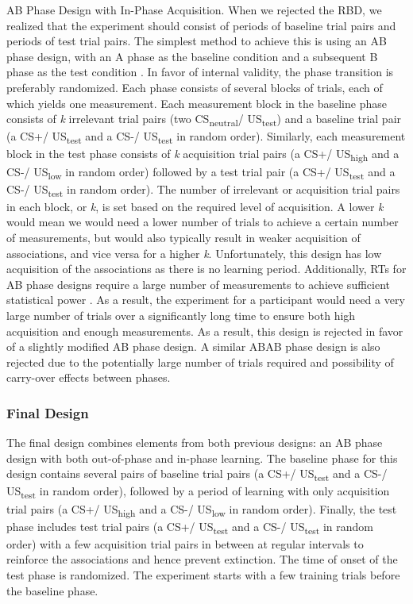 \documentclass[empirical,issue, twocolumn,authordate]{jote-new-article}
\begin{document}
AB Phase Design with In-Phase Acquisition. When we rejected the RBD, we realized that the experiment should consist of periods of baseline trial pairs and periods of test trial pairs. The simplest method to achieve this is using an AB phase design, with an A phase as the baseline condition and a subsequent B phase as the test condition \parencite{Barlow2009}. In favor of internal validity, the phase transition is preferably randomized. Each phase consists of several blocks of trials, each of which yields one measurement. Each measurement block in the baseline phase consists of \emph{k} irrelevant trial pairs (two CS\textsubscript{neutral}/ US\textsubscript{test}) and a baseline trial pair (a CS+/ US\textsubscript{test} and a CS-/ US\textsubscript{test} in random order). Similarly, each measurement block in the test phase consists of \emph{k} acquisition trial pairs (a CS+/ US\textsubscript{high} and a CS-/ US\textsubscript{low} in random order) followed by a test trial pair (a CS+/ US\textsubscript{test} and a CS-/ US\textsubscript{test} in random order). The number of irrelevant or acquisition trial pairs in each block, or \emph{k}, is set based on the required level of acquisition. A lower \emph{k} would mean we would need a lower number of trials to achieve a certain number of measurements, but would also typically result in weaker acquisition of associations, and vice versa for a higher \emph{k}. Unfortunately, this design has low acquisition of the associations as there is no learning period. Additionally, RTs for AB phase designs require a large number of measurements to achieve sufficient statistical power \parencite{Michiels2019, Ferron1995}. As a result, the experiment for a participant would need a very large number of trials over a significantly long time to ensure both high acquisition and enough measurements. As a result, this design is rejected in favor of a slightly modified AB phase design. A similar ABAB phase design is also rejected due to the potentially large number of trials required and possibility of carry-over effects between phases. 

\subsubsection{Final Design}

The final design combines elements from both previous designs: an AB phase design with both out-of-phase and in-phase learning. The baseline phase for this design contains several pairs of baseline trial pairs (a CS+/ US\textsubscript{test} and a CS-/ US\textsubscript{test} in random order), followed by a period of learning with only acquisition trial pairs (a CS+/ US\textsubscript{high} and a CS-/ US\textsubscript{low} in random order). Finally, the test phase includes test trial pairs (a CS+/ US\textsubscript{test} and a CS-/ US\textsubscript{test} in random order) with a few acquisition trial pairs in between at regular intervals to reinforce the associations and hence prevent extinction. The time of onset of the test phase is randomized. The experiment starts with a few training trials before the baseline phase. 
\end{document}
